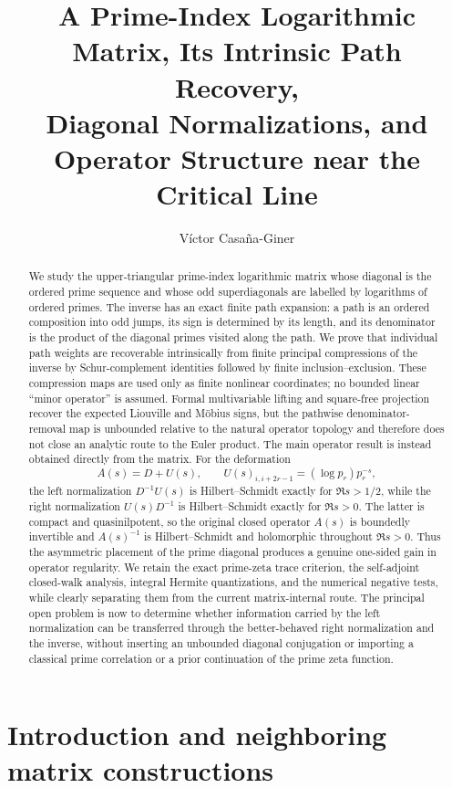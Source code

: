 \documentclass[11pt]{amsart}
\title[Prime-Index Logarithmic Matrix]{A Prime-Index Logarithmic Matrix, Its Intrinsic Path Recovery,\\
Diagonal Normalizations, and Operator Structure near the Critical Line}
\author{V\'ictor Casa\~na-Giner}
\date{}
\numberwithin{equation}{section}
\theoremstyle{plain}
\theoremstyle{definition}
\theoremstyle{remark}
\begin{document}
\begin{abstract}
We study the upper-triangular prime-index logarithmic matrix whose diagonal is the ordered prime sequence and whose odd superdiagonals are labelled by logarithms of ordered primes.  The inverse has an exact finite path expansion: a path is an ordered composition into odd jumps, its sign is determined by its length, and its denominator is the product of the diagonal primes visited along the path.  We prove that individual path weights are recoverable intrinsically from finite principal compressions of the inverse by Schur-complement identities followed by finite inclusion--exclusion.  These compression maps are used only as finite nonlinear coordinates; no bounded linear ``minor operator'' is assumed.  Formal multivariable lifting and square-free projection recover the expected Liouville and M\"obius signs, but the pathwise denominator-removal map is unbounded relative to the natural operator topology and therefore does not close an analytic route to the Euler product.  The main operator result is instead obtained directly from the matrix.  For the deformation
\[
A(s)=D+U(s),\qquad U(s)_{i,i+2r-1}=(\log p_r)p_r^{-s},
\]
the left normalization $D^{-1}U(s)$ is Hilbert--Schmidt exactly for $\Re s>1/2$, while the right normalization $U(s)D^{-1}$ is Hilbert--Schmidt exactly for $\Re s>0$.  The latter is compact and quasinilpotent, so the original closed operator $A(s)$ is boundedly invertible and $A(s)^{-1}$ is Hilbert--Schmidt and holomorphic throughout $\Re s>0$.  Thus the asymmetric placement of the prime diagonal produces a genuine one-sided gain in operator regularity.  We retain the exact prime-zeta trace criterion, the self-adjoint closed-walk analysis, integral Hermite quantizations, and the numerical negative tests, while clearly separating them from the current matrix-internal route.  The principal open problem is now to determine whether information carried by the left normalization can be transferred through the better-behaved right normalization and the inverse, without inserting an unbounded diagonal conjugation or importing a classical prime correlation or a prior continuation of the prime zeta function.
\end{abstract}
\maketitle

\enlargethispage{4pt}
\tableofcontents
\bigskip

\section{Introduction and neighboring matrix constructions}
\label{sec:introduction}
\end{document}
